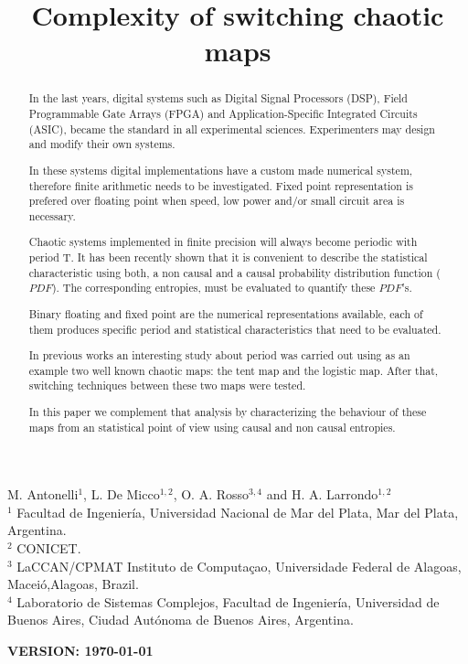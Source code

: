 \begin{frontmatter}

	\title{Complexity of switching chaotic maps}
	M. Antonelli$^{1}$, L. De Micco$^{1,2}$, O. A. Rosso$^{3,4}$ and H. A. Larrondo$^{1,2}$\\
	$^{1}$ Facultad de Ingenier\'ia, Universidad Nacional de Mar del Plata, Mar del Plata, Argentina.\\
	$^{2}$ CONICET.\\
	$^{3}$ LaCCAN/CPMAT Instituto de Computa\c{c}ao, Universidade Federal de Alagoas, Macei\'o,Alagoas, Brazil.\\
	$^{4}$ Laboratorio de Sistemas Complejos, Facultad de
	Ingenier\'ia, Universidad de Buenos Aires, Ciudad Aut\'onoma de
	Buenos Aires, Argentina.


\begin{abstract}
In the last years, digital systems such as Digital Signal Processors (DSP), Field Programmable Gate Arrays (FPGA) and Application-Specific Integrated Circuits (ASIC), became the standard in all experimental sciences.
Experimenters may design and modify their own systems.

In these systems digital implementations have a custom made numerical system, therefore finite arithmetic needs to be investigated.
Fixed point representation is prefered over floating point when  speed, low power and/or small circuit area is necessary.

Chaotic systems implemented in finite precision will always become periodic with period T.
It has been recently shown that it is convenient to describe the statistical characteristic using both, a non causal and a causal probability distribution function ($PDF$).
The corresponding entropies, must be evaluated to quantify these $PDF$'s.  

Binary floating and fixed point are the numerical representations available, each of them produces specific period and statistical characteristics that need to be evaluated.

In previous works an interesting study about period was carried out using as an example two well known chaotic maps: the tent map and the logistic map.
After that, switching techniques between these two maps were tested.

In this paper we complement that analysis by characterizing the behaviour of these maps from an statistical point of view using causal and non causal entropies.
\end{abstract}
\maketitle
\end{frontmatter}
{\bf VERSION: \today}
